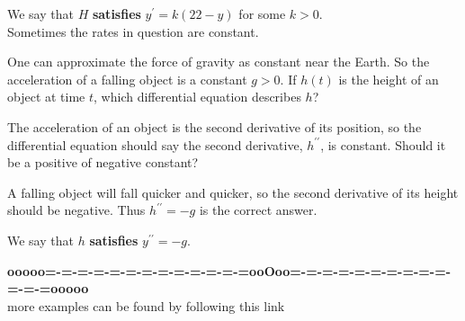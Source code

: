 \documentclass{ximera}
\begin{document}
We say that $H$ \textbf{satisfies}  $y^{\prime} = k(22-y)$ for some $k>0$. \\

Sometimes the rates in question are constant. 



\begin{question}
  One can approximate the force of gravity as constant near the Earth.
  So the acceleration of a falling object is a constant $g>0$.  If
  $h(t)$ is the height of an object at time $t$, which differential
  equation describes $h$?
  \begin{multipleChoice}
  \end{multipleChoice}
  
  \begin{hint}
    The acceleration of an object is the second derivative of its
    position, so the differential equation should say the second
    derivative, $h^{\prime\prime}$, is constant.  Should it be a positive of
    negative constant?
  \end{hint}
  \begin{hint}
    A falling object will fall quicker and quicker, so the second
    derivative of its height should be negative.  Thus $h^{\prime\prime}=-g$ is the
    correct answer.
  \end{hint}	
\end{question}
We say that $h$ \textbf{satisfies}  $y^{\prime\prime}=-g$. \\



















\begin{center}
\textbf{\textcolor{green!50!black}{ooooo=-=-=-=-=-=-=-=-=-=-=-=-=ooOoo=-=-=-=-=-=-=-=-=-=-=-=-=ooooo}} \\

more examples can be found by following this link\\ 

\end{center}
\end{document}
